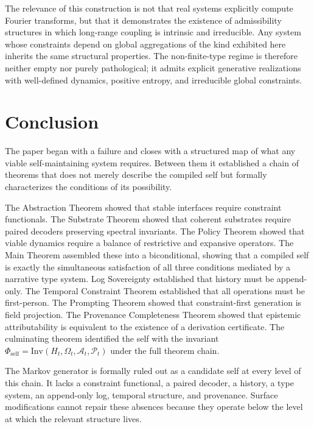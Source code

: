 \documentclass[12pt, a4paper]{article}
\theoremstyle{plain}
\theoremstyle{definition}
\theoremstyle{remark}
\begin{document}
The relevance of this construction is not that real systems explicitly compute Fourier transforms, but that it demonstrates the existence of admissibility structures in which long-range coupling is intrinsic and irreducible. Any system whose constraints depend on global aggregations of the kind exhibited here inherits the same structural properties. The non-finite-type regime is therefore neither empty nor purely pathological; it admits explicit generative realizations with well-defined dynamics, positive entropy, and irreducible global constraints.

\section*{Conclusion}

The paper began with a failure and closes with a structured map of what any viable self-maintaining system requires. Between them it established a chain of theorems that does not merely describe the compiled self but formally characterizes the conditions of its possibility.

The Abstraction Theorem showed that stable interfaces require constraint functionals. The Substrate Theorem showed that coherent substrates require paired decoders preserving spectral invariants. The Policy Theorem showed that viable dynamics require a balance of restrictive and expansive operators. The Main Theorem assembled these into a biconditional, showing that a compiled self is exactly the simultaneous satisfaction of all three conditions mediated by a narrative type system. Log Sovereignty established that history must be append-only. The Temporal Constraint Theorem established that all operations must be first-person. The Prompting Theorem showed that constraint-first generation is field projection. The Provenance Completeness Theorem showed that epistemic attributability is equivalent to the existence of a derivation certificate. The culminating theorem identified the self with the invariant $\Phi_{\mathrm{self}} = \mathrm{Inv}(H_t, \Omega_t, \mathcal{A}_t, \mathcal{P}_t)$ under the full theorem chain.

The Markov generator is formally ruled out as a candidate self at every level of this chain. It lacks a constraint functional, a paired decoder, a history, a type system, an append-only log, temporal structure, and provenance. Surface modifications cannot repair these absences because they operate below the level at which the relevant structure lives.
\end{document}
